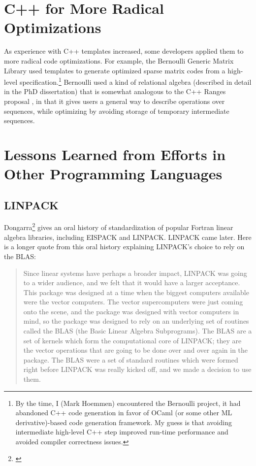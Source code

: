 \section{C++ for More Radical Optimizations}

As experience with C++ templates increased, some developers applied them to more
radical code optimizations.  For example, the Bernoulli Generic Matrix Library
used templates to generate optimized sparse matrix codes from a high-level
specification.\footnote{\cite{Ahmed2000} By the time, I (Mark Hoemmen)
encountered the Bernoulli project, it had abandoned C++ code generation in
favor of OCaml (or some other ML derivative)-based code generation framework.
My guess is that avoiding intermediate high-level C++ step improved run-time
performance and avoided compiler correctness issues.}  Bernoulli used a kind of
relational algebra (described in detail in the PhD dissertation) that is
somewhat analogous to the C++ Ranges proposal \cite{Niebler2018}, in that it gives
users a general way to describe operations over sequences, while optimizing by
avoiding storage of temporary intermediate sequences.

\section{Lessons Learned from Efforts in Other Programming Languages}

\subsection{LINPACK}

Dongarra\footnote{\cite{dongarra2005history}}
gives an oral history of standardization of popular Fortran linear algebra
libraries, including EISPACK and LINPACK.  LINPACK came later.  Here is a longer
quote from this oral history explaining LINPACK's choice to rely on the BLAS:

\begin{quote}
  Since linear systems have perhaps a broader impact, LINPACK was
  going to a wider audience, and we felt that it would have a larger acceptance.
  This package was designed at a time when the biggest computers available were
  the vector computers. The vector supercomputers were just coming onto the
  scene, and the package was designed with vector computers in mind, so the
  package was designed to rely on an underlying set of routines called the BLAS
  (the Basic Linear Algebra Subprograms). The BLAS are a set of kernels which
  form the computational core of LINPACK; they are the vector operations that
  are going to be done over and over again in the package. The BLAS were a set
  of standard routines which were formed right before LINPACK was really kicked
  off, and we made a decision to use them.
\end{quote}

